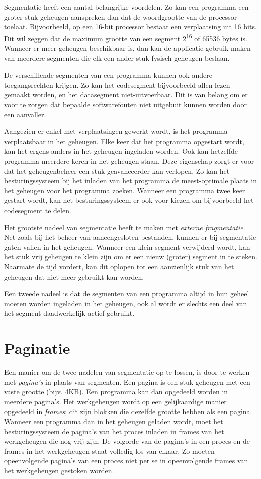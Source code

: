 
Segmentatie heeft een aantal belangrijke voordelen. Zo kan een programma een groter stuk geheugen aanspreken dan dat de woordgrootte van de processor toelaat. Bijvoorbeeld, op een 16-bit processor bestaat een verplaatsing uit 16 bits. Dit wil zeggen dat de maximum grootte van een segment 2\textsuperscript{16} of 65536 bytes is. Wanneer er meer geheugen beschikbaar is, dan kan de applicatie gebruik maken van meerdere segmenten die elk een ander stuk fysisch geheugen beslaan.

De verschillende segmenten van een programma kunnen ook andere toegangsrechten krijgen. Zo kan het codesegment bijvoorbeeld allen-lezen gemaakt worden, en het datasegment niet-uitvoerbaar. Dit is van belang om er voor te zorgen dat bepaalde softwarefouten niet uitgebuit kunnen worden door een aanvaller.

Aangezien er enkel met verplaatsingen gewerkt wordt, is het programma verplaatsbaar in het geheugen. Elke keer dat het programma opgestart wordt, kan het ergens anders in het geheugen ingeladen worden. Ook kan hetzelfde programma meerdere keren in het geheugen staan. Deze eigenschap zorgt er voor dat het geheugenbeheer een stuk geavanceerder kan verlopen. Zo kan het besturingssysteem bij het inladen van het programma de meest-optimale plaats in het geheugen voor het programma zoeken. Wanneer een programma twee keer gestart wordt, kan het besturingssysteem er ook voor kiezen om bijvoorbeeld het codesegment te delen.

Het grootste nadeel van segmentatie heeft te maken met \emph{externe fragmentatie}. Net zoals bij het beheer van aaneengesloten bestanden, kunnen er bij segmentatie gaten vallen in het geheugen. Wanneer een klein segment verwijderd wordt, kan het stuk vrij geheugen te klein zijn om er een nieuw (groter) segment in te steken. Naarmate de tijd vordert, kan dit oplopen tot een aanzienlijk stuk van het geheugen dat niet meer gebruikt kan worden.

Een tweede nadeel is dat de segmenten van een programma altijd in hun geheel moeten worden ingeladen in het geheugen, ook al wordt er slechts een deel van het segment daadwerkelijk actief gebruikt.

\section{Paginatie}

Een manier om de twee nadelen van segmentatie op te lossen, is door te werken met \emph{pagina's} in plaats van segmenten. Een pagina is een stuk geheugen met een vaste grootte (bijv. 4KB). Een programma kan dan opgedeeld worden in meerdere pagina's. Het werkgeheugen wordt op een gelijkaardige manier opgedeeld in \emph{frames}; dit zijn blokken die dezelfde grootte hebben als een pagina. Wanneer een programma dan in het geheugen geladen wordt, moet het besturingssysteem de pagina's van het proces inladen in frames van het werkgeheugen die nog vrij zijn. De volgorde van de pagina's in een proces en de frames in het werkgeheugen staat volledig los van elkaar. Zo moeten opeenvolgende pagina's van een proces niet per se in opeenvolgende frames van het werkgeheugen gestoken worden.

